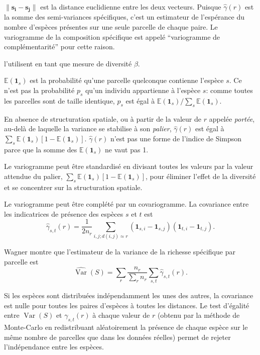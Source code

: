\documentclass[
  11pt,
  french,
  a4paper,
  extrafontsizes,onecolumn,openright
  ]{memoir}
\begin{document}
\(\|\mathbf{s_i}-\mathbf{s_j}\|\) est la distance euclidienne entre les deux vecteurs.
Puisque \(\hat{\gamma}(r)\) est la somme des semi-variances spécifiques, c'est un estimateur de l'espérance du nombre d'espèces présentes sur une seule parcelle de chaque paire.
Le variogramme de la composition spécifique est appelé \enquote{variogramme de complémentarité} pour cette raison.

\textcite{Bacaro2007a} l'utilisent en tant que mesure de diversité \(\beta\).

\({\mathbb E}({\mathbf 1}_{s})\) est la probabilité qu'une parcelle quelconque contienne l'espèce \(s\).
Ce n'est pas la probabilité \(p_s\) qu'un individu appartienne à l'espèce \(s\):
comme toutes les parcelles sont de taille identique, \(p_s\) est égal à \({{\mathbb E}({\mathbf 1}_{s})}/{\sum_s{{\mathbb E}({\mathbf 1}_{s})}}\).

En absence de structuration spatiale, ou à partir de la valeur de \(r\) appelée \emph{portée}, au-delà de laquelle la variance se stabilise à son \emph{palier}, \(\hat{\gamma}(r)\) est égal à \(\sum_s{{\mathbb E}({\mathbf 1}_{s})[1-{\mathbb E}({\mathbf 1}_{s})]}\).
\(\hat{\gamma}(r)\) n'est pas une forme de l'indice de Simpson parce que la somme des \({\mathbb E}({\mathbf 1}_{s})\) ne vaut pas 1.

Le variogramme peut être standardisé en divisant toutes les valeurs par la valeur attendue du palier, \(\sum_s{{\mathbb E}({\mathbf 1}_{s})[1-{\mathbb E}({\mathbf 1}_{s})]}\), pour éliminer l'effet de la diversité et se concentrer sur la structuration spatiale.

Le variogramme peut être complété par un covariogramme.
La covariance entre les indicatrices de présence des espèces \(s\) et \(t\) est
\begin{equation}
  \label{eq:Estgammast}
  \hat{\gamma}_{s,t}(r) = \frac{1}{2 n_r} \sum_{i,j;d(i,j)\approx r}{({\mathbf 1}_{s,i} - {\mathbf 1}_{s,j})({\mathbf 1}_{t,i} - {\mathbf 1}_{t,j})}.
\end{equation}

Wagner montre que l'estimateur de la variance de la richesse spécifique par parcelle est
\begin{equation}
  \label{eq:VarS}
  \hat{\operatorname{Var}}(S) = \sum_r{\frac{n_r}{\sum_r{n_r}}} \sum_{s,t}{\hat{\gamma}_{s,t}(r)}.
\end{equation}

Si les espèces sont distribuées indépendamment les unes des autres, la covariance est nulle pour toutes les paires d'espèces à toutes les distances.
Le test d'égalité entre \(\operatorname{Var}(S)\) et \(\gamma_{s,t}(r)\) à chaque valeur de \(r\) (obtenu par la méthode de Monte-Carlo en redistribuant aléatoirement la présence de chaque espèce sur le même nombre de parcelles que dans les données réelles) permet de rejeter l'indépendance entre les espèces.
\end{document}
